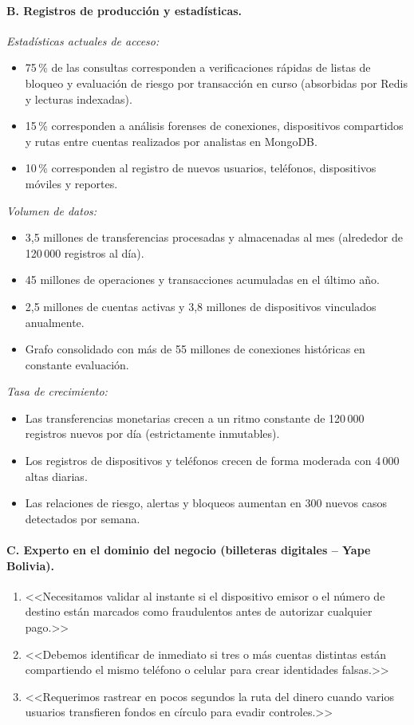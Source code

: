 \documentclass[11pt,a4paper]{article}
\begin{document}
	\paragraph{B. Registros de producción y estadísticas.}
	\textit{Estadísticas actuales de acceso:}
	\begin{itemize}[leftmargin=2em]
		\item 75\,\% de las consultas corresponden a verificaciones rápidas de listas de bloqueo y evaluación de riesgo por transacción en curso (absorbidas por Redis y lecturas indexadas).
		\item 15\,\% corresponden a análisis forenses de conexiones, dispositivos compartidos y rutas entre cuentas realizados por analistas en MongoDB.
		\item 10\,\% corresponden al registro de nuevos usuarios, teléfonos, dispositivos móviles y reportes.
	\end{itemize}
	\textit{Volumen de datos:}
	\begin{itemize}[leftmargin=2em]
		\item 3,5 millones de transferencias procesadas y almacenadas al mes (alrededor de 120\,000 registros al día).
		\item 45 millones de operaciones y transacciones acumuladas en el último año.
		\item 2,5 millones de cuentas activas y 3,8 millones de dispositivos vinculados anualmente.
		\item Grafo consolidado con más de 55 millones de conexiones históricas en constante evaluación.
	\end{itemize}
	\textit{Tasa de crecimiento:}
	\begin{itemize}[leftmargin=2em]
		\item Las transferencias monetarias crecen a un ritmo constante de 120\,000 registros nuevos por día (estrictamente inmutables).
		\item Los registros de dispositivos y teléfonos crecen de forma moderada con 4\,000 altas diarias.
		\item Las relaciones de riesgo, alertas y bloqueos aumentan en 300 nuevos casos detectados por semana.
	\end{itemize}
	
	\paragraph{C. Experto en el dominio del negocio (billeteras digitales -- Yape Bolivia).}
	\begin{enumerate}[leftmargin=2em]
		\item <<Necesitamos validar al instante si el dispositivo emisor o el número de destino están marcados como fraudulentos antes de autorizar cualquier pago.>>
		\item <<Debemos identificar de inmediato si tres o más cuentas distintas están compartiendo el mismo teléfono o celular para crear identidades falsas.>>
		\item <<Requerimos rastrear en pocos segundos la ruta del dinero cuando varios usuarios transfieren fondos en círculo para evadir controles.>>
	\end{enumerate}
	
\end{document}

